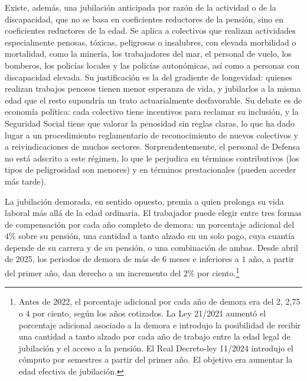 \documentclass[10pt,a4paper]{article}
\begin{document}
Existe, además, una jubilación anticipada por razón de la actividad o de la discapacidad, que no se basa en coeficientes reductores de la pensión, sino en coeficientes reductores de la edad. Se aplica a colectivos que realizan actividades especialmente penosas, tóxicas, peligrosas o insalubres, con elevada morbilidad o mortalidad, como la minería, los trabajadores del mar, el personal de vuelo, los bomberos, los policías locales y las policías autonómicas, así como a personas con discapacidad elevada. Su justificación es la del gradiente de longevidad: quienes realizan trabajos penosos tienen menor esperanza de vida, y jubilarlos a la misma edad que el resto supondría un trato actuarialmente desfavorable. Su debate es de economía política: cada colectivo tiene incentivos para reclamar su inclusión, y la Seguridad Social tiene que valorar la penosidad sin reglas claras, lo que ha dado lugar a un procedimiento reglamentario de reconocimiento de nuevos colectivos y a reivindicaciones de muchos sectores. Sorprendentemente, el personal de Defensa no está adscrito a este régimen, lo que le perjudica en términos contributivos (los tipos de peligrosidad son menores) y en términos prestacionales (pueden acceder más tarde).

La jubilación demorada, en sentido opuesto, premia a quien prolonga su vida laboral más allá de la edad ordinaria. El trabajador puede elegir entre tres formas de compensación por cada año completo de demora: un porcentaje adicional del $4\%$ sobre su pensión, una cantidad a tanto alzado en un solo pago, cuya cuantía depende de su carrera y de su pensión, o una combinación de ambas. Desde abril de 2025, los periodos de demora de más de $6$ meses e inferiores a $1$ año, a partir del primer año, dan derecho a un incremento del $2\%$ por ciento.\footnote{Antes de 2022, el porcentaje adicional por cada año de demora era del 2, 2,75 o 4 por ciento, según los años cotizados. La Ley 21/2021 aumentó el porcentaje adicional asociado a la demora e introdujo la posibilidad de recibir una cantidad a tanto alzado por cada año de trabajo entre la edad legal de jubilación y el acceso a la pensión. El Real Decreto-ley 11/2024 introdujo el cómputo por semestres a partir del primer año. El objetivo era aumentar la edad efectiva de jubilación.
}
\end{document}
